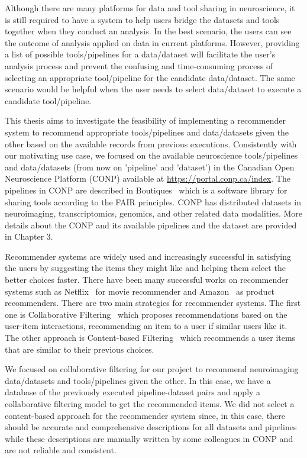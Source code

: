 Although there are many platforms for data and tool sharing in neuroscience, it is still required to have a system to help users bridge the datasets and tools together when they conduct an analysis. In the best scenario, the users can see the outcome of analysis applied on data in current platforms. However, providing a list of possible tools/pipelines for a data/dataset will facilitate the user's analysis process and prevent the confusing and time-consuming process of selecting an appropriate tool/pipeline for the candidate data/dataset. The same scenario would be helpful when the user needs to select data/dataset to execute a candidate tool/pipeline.

This thesis aims to investigate the feasibility of implementing a recommender system to recommend appropriate tools/pipelines and data/datasets given the other based on the available records from previous executions. Consistently with our motivating use case, we focused on the available neuroscience tools/pipelines and data/datasets (from now on 'pipeline' and 'dataset') in the Canadian Open Neuroscience Platform (CONP) available at \url{https://portal.conp.ca/index}. The pipelines in CONP are described in Boutiques~\cite{glatard2018boutiques} which is a software library for sharing tools according to the FAIR principles. CONP has distributed datasets in neuroimaging, transcriptomics, genomics, and other related data modalities. More details about the CONP and its available pipelines and the dataset are provided in Chapter 3.



Recommender systems are widely used and increasingly successful in satisfying the users by suggesting the items they might like and helping them select the better choices faster. There have been many successful works on recommender systems such as Netflix~\cite{bennett2007netflix} for movie recommender and Amazon~\cite{7927889} as product recommenders. There are two main strategies for recommender systems. The first one is Collaborative Filtering~\cite{rajaraman2011mining} which proposes recommendations based on the user-item interactions, recommending an item to a user if similar users like it. The other approach is Content-based Filtering~\cite{pazzani2007content} which recommends a user items that are similar to their previous choices.  

We focused on collaborative filtering for our project to recommend neuroimaging data/datasets and tools/pipelines given the other. In this case, we have a database of the previously executed pipeline-dataset pairs and apply a collaborative filtering model to get the recommended items. We did not select a content-based approach for the recommender system since, in this case, there should be accurate and comprehensive descriptions for all datasets and pipelines while these descriptions are manually written by some colleagues in CONP and are not reliable and consistent.   

